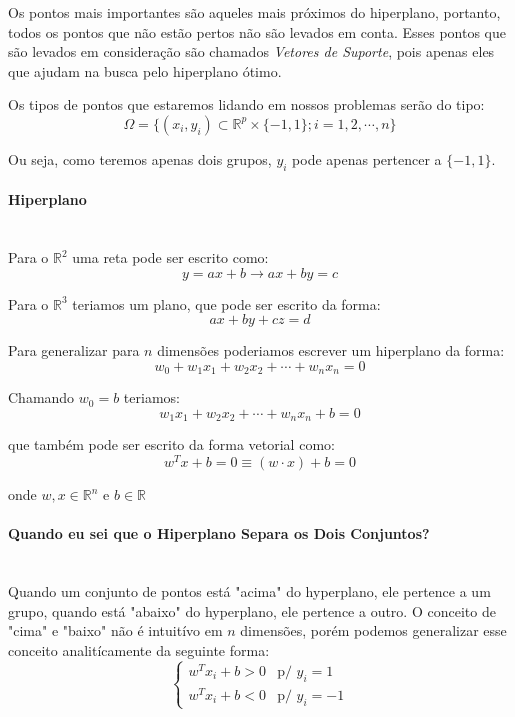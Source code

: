 \documentclass{article}
\begin{document}
Os pontos mais importantes são aqueles mais próximos do hiperplano, portanto, todos os pontos que não estão pertos não são levados em conta. Esses pontos que são levados em consideração são chamados \textit{Vetores de Suporte}, pois apenas eles que ajudam na busca pelo hiperplano ótimo.

Os tipos de pontos que estaremos lidando em nossos problemas serão do tipo:
\[\Omega =\{(x_i,y_i)\subset\mathbb{R}^{p}\times\{-1,1\};i=1,2,\cdots,n\}\]

Ou seja, como teremos apenas dois grupos, \(y_i\) pode apenas pertencer a \(\{-1,1\}\).

\paragraph{Hiperplano} \hspace{0pt}\\

Para o \(\mathbb{R}^2\) uma reta pode ser escrito como:
\[y=ax+b\rightarrow ax+by=c\]

Para o \(\mathbb{R}^3\) teriamos um plano, que pode ser escrito da forma:
\[ax+by+cz=d\]

Para generalizar para \(n\) dimensões poderiamos escrever um hiperplano da forma:
\[w_0+w_1x_1+w_2x_2+\cdots+w_nx_n=0\]

Chamando \(w_0=b\) teriamos:
\[w_1x_1+w_2x_2+\cdots+w_nx_n+b=0\]

que também pode ser escrito da forma vetorial como:
\[w^Tx+b=0\equiv (w\cdot x)+b=0\]

onde \(w,x\in\mathbb{R}^n\) e \(b\in\mathbb{R}\)



\paragraph{Quando eu sei que o Hiperplano Separa os Dois Conjuntos?}\hspace{0pt}\\

Quando um conjunto de pontos está "acima" do hyperplano, ele pertence a um grupo, quando está "abaixo" do hyperplano, ele pertence a outro. 
O conceito de "cima" e "baixo" não é intuitívo em \(n\) dimensões, porém podemos generalizar esse conceito analitícamente da seguinte forma:
\begin{equation}
    \begin{cases}
        w^Tx_i+b>0 &\text{p/ } y_i=1 \\w^Tx_i+b<0 &\text{p/ } y_i=-1
    \end{cases}
\end{equation}
\end{document}

